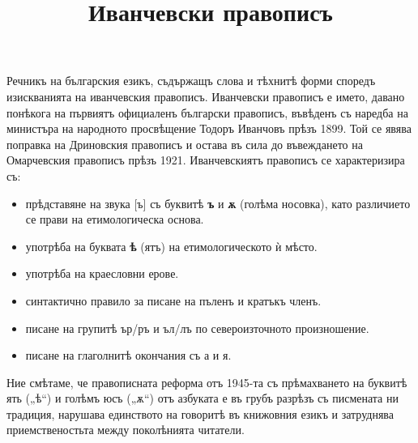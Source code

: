 \documentclass{article}
\begin{document}
	\title{Иванчевски правописъ}
	\maketitle
	
	Речникъ на българския езикъ, съдържащъ слова и тѣхнитѣ форми споредъ изискванията на иванчевския правописъ. 
	Иванчевски правописъ е името, давано понѣкога на първиятъ официаленъ български правописъ, 
	въвѣденъ съ наредба на министъра на народното просвѣщение Тодоръ Иванчовъ прѣзъ 1899.
 	Той се явява поправка на Дриновския правописъ и остава въ сила до въвеждането на Омарчевския правописъ прѣзъ 1921. 
 	Иванчевскиятъ правописъ се характеризира съ:
 	\begin{itemize}
 		\item прѣдставяне на звука [ъ] съ буквитѣ \textbf{ъ} и \textbf{ѫ} (голѣма носовка), като различието се прави на етимологическа основа.
 		\item употрѣба на буквата \textbf{ѣ} (ятъ) на етимологическото ѝ мѣсто.
 		\item употрѣба на краесловни ерове.
 		\item синтактично правило за писане на пъленъ и кратъкъ членъ.
 		\item писане на групитѣ ър/ръ и ъл/лъ по североизточното произношение.
 		\item писане на глаголнитѣ окончания съ а и я.
 	\end{itemize}
    
    
    Ние смѣтаме, че правописната реформа отъ 1945-та съ прѣмахването на буквитѣ ять („ѣ“) и голѣмъ юсъ („ѫ“) отъ азбуката е въ грубъ разрѣзъ съ писмената ни традиция, нарушава единството на говоритѣ въ книжовния езикъ и затруднява приемственостьта между поколѣнията читатели.
 
\end{document}
